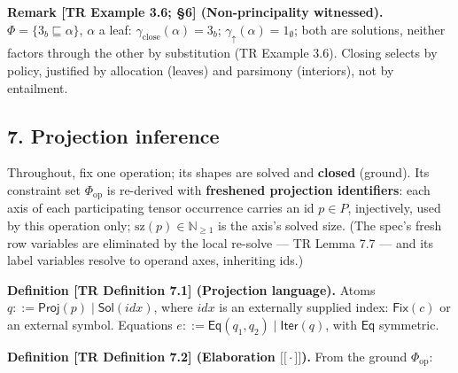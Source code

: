 \documentclass[
  10pt,
  letterpaper,
]{article}
\providecommand{\llbracket}{\mathopen{[\![}}
\providecommand{\rrbracket}{\mathclose{]\!]}}
\begin{document}
\textbf{Remark {[}TR Example 3.6; §6{]} (Non-principality witnessed).}
\(\Phi = \{3_b \sqsubseteq \alpha\}\), \(\alpha\) a leaf:
\(\gamma_{\mathrm{close}}(\alpha) = 3_b\);
\(\gamma_\uparrow(\alpha) = 1_\emptyset\); both are solutions, neither
factors through the other by substitution (TR Example 3.6). Closing
selects by policy, justified by allocation (leaves) and parsimony
(interiors), not by entailment.

\subsection{7. Projection inference}\label{projection-inference}

Throughout, fix one operation; its shapes are solved and \textbf{closed}
(ground). Its constraint set \(\Phi_{\mathrm{op}}\) is re-derived with
\textbf{freshened projection identifiers}: each axis of each
participating tensor occurrence carries an id \(p \in P\), injectively,
used by this operation only; \(\mathrm{sz}(p) \in \mathbb{N}_{\ge 1}\)
is the axis's solved size. (The spec's fresh row variables are
eliminated by the local re-solve --- TR Lemma 7.7 --- and its label
variables resolve to operand axes, inheriting ids.)

\textbf{Definition {[}TR Definition 7.1{]} (Projection language).} Atoms
\(q ::= \mathsf{Proj}(p) \mid \mathsf{Sol}(\mathit{idx})\), where
\(\mathit{idx}\) is an externally supplied index: \(\mathsf{Fix}(c)\) or
an external symbol. Equations
\(e ::= \mathsf{Eq}(q_1, q_2) \mid \mathsf{Iter}(q)\), with
\(\mathsf{Eq}\) symmetric.

\textbf{Definition {[}TR Definition 7.2{]} (Elaboration
\(\llbracket\cdot\rrbracket\)).} From the ground \(\Phi_{\mathrm{op}}\):
\end{document}
